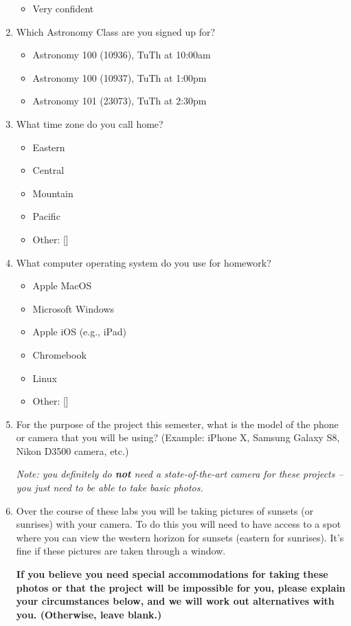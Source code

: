 \documentclass[12pt]{article}
\begin{document}
\begin{enumerate}
\begin{itemize}
    \item Very confident
\end{itemize}
\item
Which Astronomy Class are you signed up for?
\begin{itemize}
    \item Astronomy 100 (10936), TuTh at 10:00am
    \item Astronomy 100 (10937), TuTh at 1:00pm
    \item Astronomy 101 (23073), TuTh at 2:30pm
\end{itemize}
\item
What time zone do you call home?
\begin{itemize}
    \item Eastern
    \item Central
    \item Mountain
    \item Pacific
    \item Other: []
\end{itemize}
\item
What computer operating system do you use for homework?
\begin{itemize}
    \item Apple MacOS
    \item Microsoft Windows
    \item Apple iOS (e.g., iPad)
    \item Chromebook
    \item Linux
    \item Other: []
\end{itemize}
\item
For the purpose of the project this semester, what is the model of the phone or camera that you will be using? (Example: iPhone X, Samsung Galaxy S8, Nikon D3500 camera, etc.)

\textit{Note: you definitely do \textbf{not} need a state-of-the-art camera for these projects -- you just need to be able to take basic photos.}
\item
Over the course of these labs you will be taking pictures of sunsets (or sunrises) with your camera. To do this you will need to have access to a spot where you can view the western horizon for sunsets (eastern for sunrises). It's fine if these pictures are taken through a window.

\textbf{If you believe you need special accommodations for taking these photos or that the project will be impossible for you, please explain your circumstances below, and we will work out alternatives with you. (Otherwise, leave blank.)}
\end{enumerate}
\end{document}
